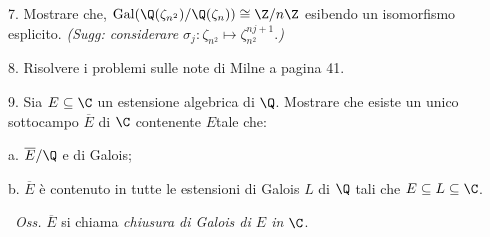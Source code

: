 \item{7.} Mostrare che,
${\rm Gal}(\Q(\zeta_{n^2})/\Q(\zeta_{n}))\cong \Z/n\Z$
esibendo un isomorfismo esplicito. \hfill {\it (Sugg: considerare $\sigma_j:\zeta_{n^2}\mapsto \zeta_{n^2}^{nj+1}.$)}
\bigskip

 \item{8.} Risolvere i problemi sulle note di Milne a pagina
41. \bigskip

\item{9.} Sia $E\subseteq \C$ un estensione algebrica di $\Q$. Mostrare che esiste un unico sottocampo
$\overline{E}$ di $\C$ contenente $E$tale che:
\item{a.} $\overline{E}/\Q$  e di Galois;
\item{b.} $\overline{E}$ \`{e} contenuto in tutte le estensioni di Galois $L$ di $\Q$ tali che $E\subseteq L\subseteq \C$.

\ \hfill {\it Oss.} $\overline{E}$ si chiama {\it chiusura di Galois di $E$ in $\C$}.
\bye
